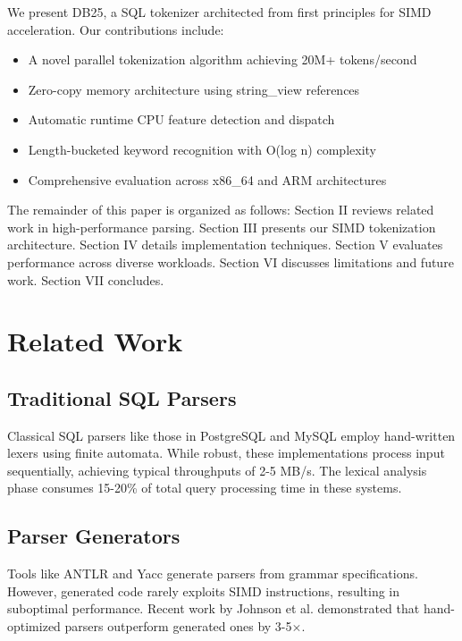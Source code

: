 \documentclass[conference]{IEEEtran}
\begin{document}
We present DB25, a SQL tokenizer architected from first principles for SIMD acceleration. Our contributions include:

\begin{itemize}
\item A novel parallel tokenization algorithm achieving 20M+ tokens/second
\item Zero-copy memory architecture using string\_view references
\item Automatic runtime CPU feature detection and dispatch
\item Length-bucketed keyword recognition with O(log n) complexity
\item Comprehensive evaluation across x86\_64 and ARM architectures
\end{itemize}

The remainder of this paper is organized as follows: Section II reviews related work in high-performance parsing. Section III presents our SIMD tokenization architecture. Section IV details implementation techniques. Section V evaluates performance across diverse workloads. Section VI discusses limitations and future work. Section VII concludes.

\section{Related Work}

\subsection{Traditional SQL Parsers}

Classical SQL parsers like those in PostgreSQL \cite{postgresql2023} and MySQL \cite{mysql2023} employ hand-written lexers using finite automata. While robust, these implementations process input sequentially, achieving typical throughputs of 2-5 MB/s. The lexical analysis phase consumes 15-20\% of total query processing time in these systems.

\subsection{Parser Generators}

Tools like ANTLR \cite{parr2013} and Yacc generate parsers from grammar specifications. However, generated code rarely exploits SIMD instructions, resulting in suboptimal performance. Recent work by Johnson et al. \cite{johnson2022} demonstrated that hand-optimized parsers outperform generated ones by 3-5$\times$.
\end{document}
